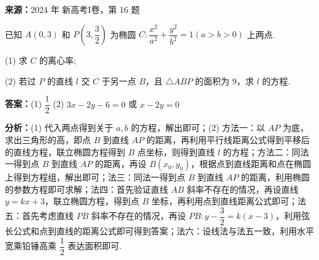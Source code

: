 \begin{question}[points=15]
\textbf{来源：}2024 年 新高考I卷，第 16 题\par
已知 $A(0,3)$ 和 $P\left(3,\dfrac{3}{2}\right)$ 为椭圆 $C:\dfrac{x^2}{a^2}+\dfrac{y^2}{b^2}=1(a>b>0)$ 上两点.

(1) 求 $C$ 的离心率;

(2) 若过 $P$ 的直线 $l$ 交 $C$ 于另一点 $B$，且 $\triangle ABP$ 的面积为 $9$，求 $l$ 的方程.
\begin{solution}
\textbf{答案：}(1) $\dfrac{1}{2}$ (2) $3x-2y-6=0$ 或 $x-2y=0$

\textbf{分析：}(1) 代入两点得到关于 $a,b$ 的方程，解出即可；(2) 方法一：以 $AP$ 为底，求出三角形的高，即点 $B$ 到直线 $AP$ 的距离，再利用平行线距离公式得到平移后的直线方程，联立椭圆方程得到 $B$ 点坐标，则得到直线 $l$ 的方程；方法二：同法一得到点 $B$ 到直线 $AP$ 的距离，再设 $B(x_0,y_0)$，根据点到直线距离和点在椭圆上得到方程组，解出即可；法三：同法一得到点 $B$ 到直线 $AP$ 的距离，利用椭圆的参数方程即可求解；法四：首先验证直线 $AB$ 斜率不存在的情况，再设直线 $y=kx+3$，联立椭圆方程，得到点 $B$ 坐标，再利用点到直线距离公式即可；法五：首先考虑直线 $PB$ 斜率不存在的情况，再设 $PB: y-\dfrac{3}{2}=k(x-3)$，利用弦长公式和点到直线的距离公式即可得到答案；法六：设线法与法五一致，利用水平宽乘铅锤高乘 $\dfrac{1}{2}$ 表达面积即可.


\end{solution}
\end{question}
